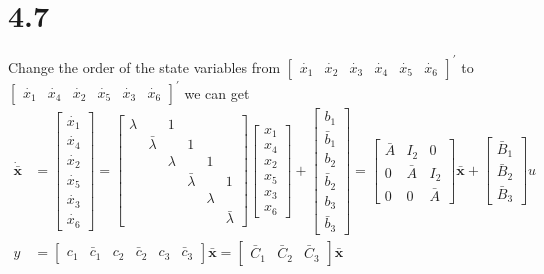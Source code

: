 \documentclass{article}
\begin{document}
\section*{4.7}
Change the order of the state variables from $\begin{bmatrix}
\dot{x_{1}} &
\dot{x_{2}} &
\dot{x_{3}}&
\dot{x_{4}} &
\dot{x_{5}} &
\dot{x_{6}}\end{bmatrix}^{'}$ to $\begin{bmatrix}\dot{x_{1}} &
\dot{x_{4}} &
\dot{x_{2}} &
\dot{x_{5}}&
\dot{x_{3}} &
\dot{x_{6}}\end{bmatrix}^{'}$ we can get
$$
\begin{aligned}
\dot{\bar{\pmb{x}}}&
=\begin{bmatrix}
\dot{x_{1}} \\
\dot{x_{4}} \\
\dot{x_{2}} \\
\dot{x_{5}}\\
\dot{x_{3}} \\
\dot{x_{6}}
\end{bmatrix}=\begin{bmatrix}
\lambda && 1  & & \\
& \bar{\lambda} & & 1 & & \\
& & \lambda & & 1 & \\
& & & \bar{\lambda} & & 1 \\
& & & & \lambda & \\
& & & & & \bar{\lambda}
\end{bmatrix}
\begin{bmatrix}
x_{1} \\
x_{4} \\
x_{2} \\
x_{5} \\
x_{3} \\
x_{6}
\end{bmatrix}+\begin{bmatrix}
b_{1} \\
\bar{b}_{1} \\
b_{2} \\
\bar{b}_{2} \\
b_{3} \\
\bar{b}_{3}
\end{bmatrix}=\begin{bmatrix}
\bar{A} & I_{2} & 0 \\
0 & \bar{A} & I_{2} \\
0 & 0 & \bar{A}
\end{bmatrix}\bar{\pmb{x}}+\begin{bmatrix}
\bar{B}_{1} \\
\bar{B}_{2} \\
\bar{B}_{3}
\end{bmatrix} u\\
y&=\left[\begin{array}{llllll}
c_{1} & \bar{c}_{1} & c_{2} & \bar{c}_{2} & c_{3} & \bar{c}_{3}
\end{array}\right] \bar{\pmb{x}}=\left[\begin{array}{lll}
\bar{C}_{1} & \bar{C}_{2} & \bar{C}_{3}
\end{array}\right] \bar{\pmb{x}}\end{aligned}
$$
\end{document}
